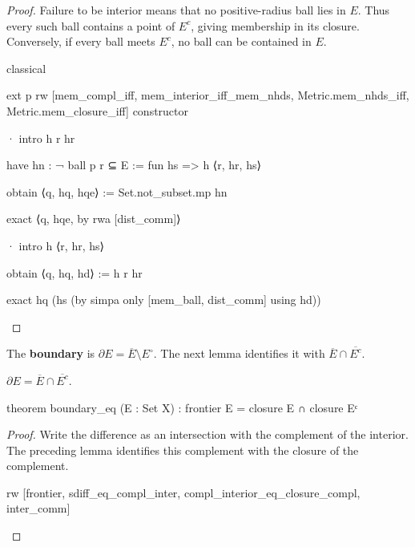\begin{proof}
  Failure to be interior means that no positive-radius ball lies in $E$.
  Thus every such ball contains a point of $E^{c}$, giving membership in its closure.
  Conversely, if every ball meets $E^{c}$, no ball can be contained in $E$.

  \begin{lean}
    classical

    ext p
    rw [mem_compl_iff, mem_interior_iff_mem_nhds, Metric.mem_nhds_iff,
      Metric.mem_closure_iff]
    constructor

    · intro h r hr

      have hn : ¬ ball p r ⊆ E := fun hs => h ⟨r, hr, hs⟩

      obtain ⟨q, hq, hqe⟩ := Set.not_subset.mp hn

      exact ⟨q, hqe, by rwa [dist_comm]⟩

    · intro h ⟨r, hr, hs⟩

      obtain ⟨q, hq, hd⟩ := h r hr

      exact hq (hs (by simpa only [mem_ball, dist_comm] using hd))
  \end{lean}

\end{proof}

\begin{definition}
  \label{an1:def:boundary}
  The \textbf{boundary} is $\partial E=\overline E\setminus E^{\circ}$.
  The next lemma identifies it with $\overline E\cap\overline{E^{c}}$.
\end{definition}

\begin{lemma}
  \label{an1:lem:boundary-eq}
  $\partial E=\overline E\cap\overline{E^{c}}$.

  \begin{lean}
    theorem boundary_eq (E : Set X) :
        frontier E = closure E ∩ closure Eᶜ
  \end{lean}
\end{lemma}

\begin{proof}
  Write the difference as an intersection with the complement of the interior.
  The preceding lemma identifies this complement with the closure of the complement.

  \begin{lean}
    rw [frontier, sdiff_eq_compl_inter, compl_interior_eq_closure_compl, inter_comm]
  \end{lean}

\end{proof}

